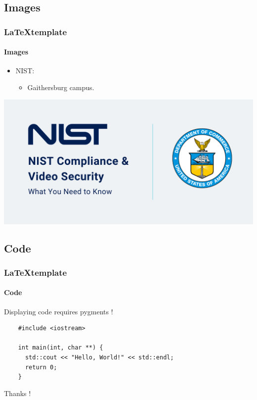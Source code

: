 \documentclass[aspectratio=169]{beamer}
\begin{document}
\subsection{Images}
\begin{frame}
  \frametitle{\LaTeX template}
  \framesubtitle{Images}

  \begin{minipage}[h!]{0.45\textwidth}
    \begin{itemize}
      \item NIST:
      \begin{itemize}
        \item Gaithersburg campus.
      \end{itemize}
    \end{itemize}
  \end{minipage}\hfill
  \begin{minipage}[h!]{0.45\textwidth}
    \includegraphics[scale=0.2]{./img/example-image.png}
  \end{minipage}
\end{frame}

\subsection{Code}
\begin{frame}[containsverbatim]
  \frametitle{\LaTeX template}
  \framesubtitle{Code}

  Displaying code requires pygments !

  \begin{verbatim}
    #include <iostream>

    int main(int, char **) {
      std::cout << "Hello, World!" << std::endl;
      return 0;
    }
  \end{verbatim}

\end{frame}

\begin{frame}
  \centering
  \LARGE Thanks !
\end{frame}
\end{document}
